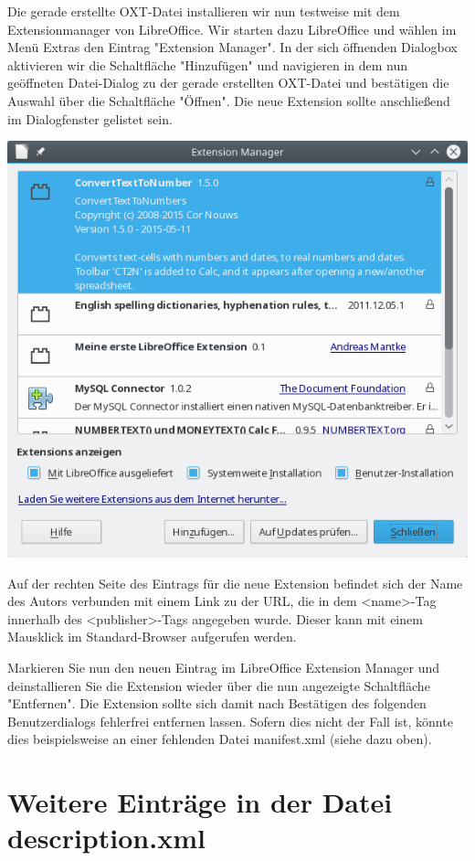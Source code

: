 \documentclass[a4paper,10pt,pagesize,titlepage]{scrbook}
\begin{document}
Die gerade erstellte OXT-Datei installieren wir nun testweise mit dem Extensionmanager von LibreOffice. Wir starten dazu LibreOffice und wählen im Menü Extras den Eintrag "Extension Manager". In der sich öffnenden Dialogbox aktivieren wir die Schaltfläche "Hinzufügen" und navigieren in dem nun geöffneten Datei-Dialog zu der gerade erstellten OXT-Datei und bestätigen die Auswahl über die Schaltfläche "Öffnen". Die neue Extension sollte anschließend im Dialogfenster gelistet sein.
\begin{center}
	\captionsetup{type=figure}
\includegraphics[width=0.7\linewidth]{pics/extensionmanager_extension_load01}
\label{fig:extensionmanager_extension_load01}
\end{center}



Auf der rechten Seite des Eintrags für die neue Extension befindet sich der Name des Autors verbunden mit einem Link zu der URL, die in dem <name>-Tag innerhalb des <publisher>-Tags angegeben wurde. Dieser kann mit einem Mausklick im Standard-Browser aufgerufen werden.

Markieren Sie nun den neuen Eintrag im LibreOffice Extension Manager und deinstallieren Sie die Extension wieder über die nun angezeigte Schaltfläche "Entfernen". Die Extension sollte sich damit nach Bestätigen des folgenden Benutzerdialogs fehlerfrei entfernen lassen. Sofern dies nicht der Fall ist, könnte dies beispielsweise an einer fehlenden Datei manifest.xml (siehe dazu oben).

\section{Weitere Einträge in der Datei description.xml}
\end{document}
